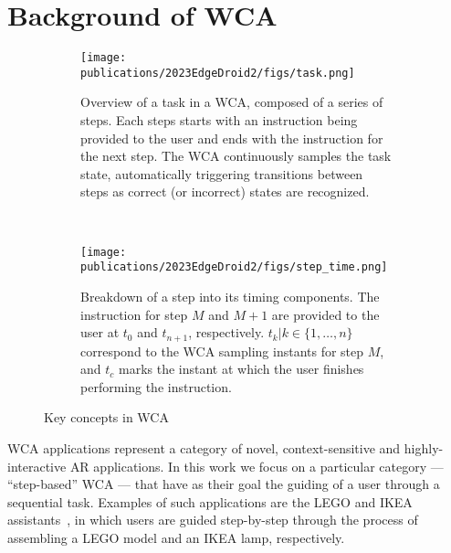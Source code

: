 \section{Background of \acs*{WCA}}\label{sec:background}

\begin{figure}
    \centering
    \begin{subfigure}{\columnwidth}
        \centering
        \texttt{[image: publications/2023EdgeDroid2/figs/task.png]}
        \caption{%
            Overview of a task in a \gls{WCA}, composed of a series of steps.
            Each steps starts with an instruction being provided to the user and ends with the instruction for the next step.
            The \gls{WCA} continuously samples the task state, automatically triggering transitions between steps as correct (or incorrect) states are recognized.
        }\label{fig:task}
    \end{subfigure}\\
    \begin{subfigure}{\columnwidth}
        \centering
        \texttt{[image: publications/2023EdgeDroid2/figs/step\_time.png]}
        \caption{%
            Breakdown of a step into its timing components.
            The instruction for step \( M \) and \( M + 1 \) are provided to the user at \( t_0 \) and \( t_{n+1} \), respectively.
            \( t_k | k \in \{1, \ldots, n \} \) correspond to the \gls{WCA} sampling instants for step \( M \), and \( t_c \) marks the instant at which the user finishes performing the instruction.
        }\label{fig:step}
    \end{subfigure}
    \caption{Key concepts in \acl{WCA}}
\end{figure}

\acf{WCA} applications represent a category of novel, context-sensitive and highly-interactive \gls{AR} applications.
In this work we focus on a particular category --- ``step-based'' \gls{WCA} --- that have as their goal the guiding of a user through a sequential task.
Examples of such applications are the LEGO and IKEA assistants~\cite{Chen2015LEGO,Chen2018application}, in which users are guided step-by-step through the process of assembling a LEGO model and an IKEA lamp, respectively.

